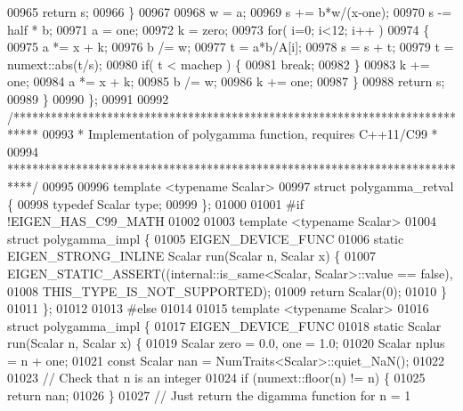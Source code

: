 \begin{DoxyCode}
00965             \textcolor{keywordflow}{return} s;
00966         \}
00967 
00968         w = a;
00969         s += b*w/(x-one);
00970         s -= half * b;
00971         a = one;
00972         k = zero;
00973         \textcolor{keywordflow}{for}( i=0; i<12; i++ )
00974         \{
00975             a *= x + k;
00976             b /= w;
00977             t = a*b/A[i];
00978             s = s + t;
00979             t = numext::abs(t/s);
00980             \textcolor{keywordflow}{if}( t < machep ) \{
00981               \textcolor{keywordflow}{break};
00982             \}
00983             k += one;
00984             a *= x + k;
00985             b /= w;
00986             k += one;
00987         \}
00988         \textcolor{keywordflow}{return} s;
00989   \}
00990 \};
00991 
00992 \textcolor{comment}{/****************************************************************************}
00993 \textcolor{comment}{ * Implementation of polygamma function, requires C++11/C99                 *}
00994 \textcolor{comment}{ ****************************************************************************/}
00995 
00996 \textcolor{keyword}{template} <\textcolor{keyword}{typename} Scalar>
00997 \textcolor{keyword}{struct }polygamma\_retval \{
00998     \textcolor{keyword}{typedef} Scalar type;
00999 \};
01000 
01001 \textcolor{preprocessor}{#if !EIGEN\_HAS\_C99\_MATH}
01002 
01003 \textcolor{keyword}{template} <\textcolor{keyword}{typename} Scalar>
01004 \textcolor{keyword}{struct }polygamma\_impl \{
01005     EIGEN\_DEVICE\_FUNC
01006     \textcolor{keyword}{static} EIGEN\_STRONG\_INLINE Scalar run(Scalar n, Scalar x) \{
01007         EIGEN\_STATIC\_ASSERT((internal::is\_same<Scalar, Scalar>::value == \textcolor{keyword}{false}),
01008                             THIS\_TYPE\_IS\_NOT\_SUPPORTED);
01009         \textcolor{keywordflow}{return} Scalar(0);
01010     \}
01011 \};
01012 
01013 \textcolor{preprocessor}{#else}
01014 
01015 \textcolor{keyword}{template} <\textcolor{keyword}{typename} Scalar>
01016 \textcolor{keyword}{struct }polygamma\_impl \{
01017     EIGEN\_DEVICE\_FUNC
01018     \textcolor{keyword}{static} Scalar run(Scalar n, Scalar x) \{
01019         Scalar zero = 0.0, one = 1.0;
01020         Scalar nplus = n + one;
01021         \textcolor{keyword}{const} Scalar nan = NumTraits<Scalar>::quiet\_NaN();
01022 
01023         \textcolor{comment}{// Check that n is an integer}
01024         \textcolor{keywordflow}{if} (numext::floor(n) != n) \{
01025             \textcolor{keywordflow}{return} nan;
01026         \}
01027         \textcolor{comment}{// Just return the digamma function for n = 1}

\end{DoxyCode}
